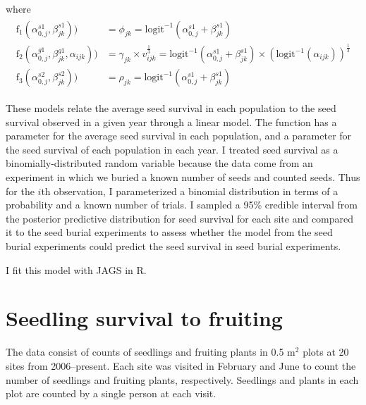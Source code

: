 \documentclass[12pt, oneside, titlepage]{article}   	%
\begin{document}
%
where
%
\begin{align}
  \begin{split}
\mathrm{f}_1(\alpha^{s1}_{0,j} , \beta^{s1}_{jk} ) ) & =  \phi_{jk} = \mathrm{logit}^{-1}(\alpha^{s1}_{0,j} + \beta^{s1}_{jk}) \\
\mathrm{f}_2(\alpha^{g1}_{0,j} , \beta^{g1}_{jk},  \alpha_{ijk} ) ) & = \gamma_{jk} \times v_{ijk}^\frac{1}{3} = \mathrm{logit}^{-1}(\alpha^{s1}_{0,j} + \beta^{s1}_{jk}) \times ( \mathrm{logit}^{-1}(\alpha_{ijk}))^\frac{1}{3} \\
\mathrm{f}_3(\alpha^{s2}_{0,j} , \beta^{s2}_{jk} ) ) & =  \rho_{jk} = \mathrm{logit}^{-1}(\alpha^{s1}_{0,j} + \beta^{s1}_{jk})
  \end{split}
\end{align}

These models relate the average seed survival in each population to the seed survival observed in a given year through a linear model. The function has a parameter for the average seed survival in each population, and a parameter for the seed survival of each population in each year. I treated seed survival as a binomially-distributed random variable because the data come from an experiment in which we buried a known number of seeds and counted seeds. Thus for the $i$th observation, I parameterized a binomial distribution in terms of a probability and a known number of trials. I sampled a 95\% credible interval from the posterior predictive distribution for seed survival for each site and compared it to the seed burial experiments to assess whether the model from the seed burial experiments could predict the seed survival in seed burial experiments. 

I fit this model with JAGS in R. %

\section*{Seedling survival to fruiting}

The data consist of counts of seedlings and fruiting plants in 0.5 m$^2$ plots at 20 sites from 2006--present. Each site was visited in February and June to count the number of seedlings and fruiting plants, respectively. Seedlings and plants in each plot are counted by a single person at each visit. 
\end{document}
